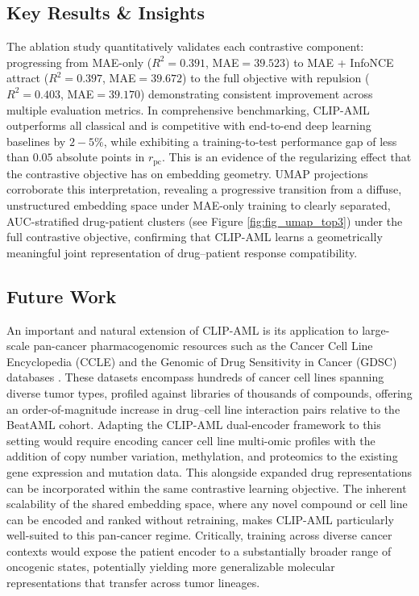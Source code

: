 \documentclass[sigconf,authordraft]{acmart}
\begin{document}
\subsection{Key Results \& Insights}
The ablation study quantitatively validates each contrastive component: progressing from MAE-only ($R^{2} = 0.391$, MAE$ = 39.523$) to MAE + InfoNCE attract ($R^{2} = 0.397$, MAE$ = 39.672$) to the full objective with repulsion ($R^{2} = 0.403$, MAE$ = 39.170$) demonstrating consistent improvement across multiple evaluation metrics. In comprehensive benchmarking, CLIP-AML outperforms all classical and is competitive with end-to-end deep learning baselines by $2-5\%$, while exhibiting a training-to-test performance gap of less than $0.05$ absolute points in $r_{\text{pc}}$. This %
is an evidence of the regularizing effect that the contrastive objective has on embedding geometry. UMAP projections corroborate this interpretation, revealing a progressive transition from a diffuse, unstructured embedding space under MAE-only training to clearly separated, AUC-stratified drug-patient clusters (see Figure \ref{fig:fig_umap_top3}) under the full contrastive objective, confirming that CLIP-AML learns a geometrically meaningful joint representation of drug–patient response compatibility.
\subsection{Future Work}
An important and natural extension of CLIP-AML is its application to large-scale pan-cancer pharmacogenomic resources such as the Cancer Cell Line Encyclopedia (CCLE) \cite{bouhaddou2016drug} and the Genomic of Drug Sensitivity in Cancer (GDSC) databases \cite{yang2012genomics}. These datasets encompass hundreds of cancer cell lines spanning diverse tumor types, profiled against libraries of thousands of compounds, offering an order-of-magnitude increase in drug–cell line interaction pairs relative to the BeatAML cohort. Adapting the CLIP-AML dual-encoder framework to this setting would require encoding cancer cell line multi-omic profiles with the addition of copy number variation, methylation, and proteomics to the existing gene expression and mutation data. This alongside expanded drug representations can be incorporated within the same contrastive learning objective. The inherent scalability of the shared embedding space, where any novel compound or cell line can be encoded and ranked without retraining, makes CLIP-AML particularly well-suited to this pan-cancer regime. Critically, training across diverse cancer contexts would expose the patient encoder to a substantially broader range of oncogenic states, potentially yielding more generalizable molecular representations that transfer across tumor lineages. 
\end{document}
